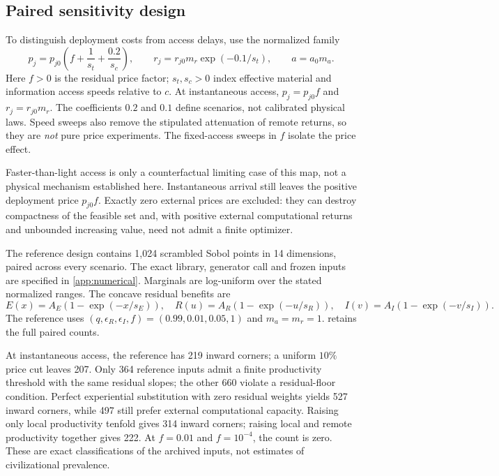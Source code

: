 \subsection{Paired sensitivity design}
To distinguish deployment costs from access delays, use the normalized
family
\begin{equation}
 p_j=p_{j0}\left(f+\frac{1}{s_t}+\frac{0.2}{s_c}\right),\qquad
 r_j=r_{j0}m_r\exp(-0.1/s_t),\qquad a=a_0m_a.
 \label{eq:speed-map}
\end{equation}
Here $f>0$ is the residual price factor; $s_t,s_c>0$ index effective
material and information access speeds relative to $c$.
At instantaneous access, $p_j=p_{j0}f$ and $r_j=r_{j0}m_r$.
The coefficients $0.2$ and $0.1$ define scenarios, not calibrated physical
laws. Speed sweeps also remove the stipulated attenuation of remote
returns, so they are \emph{not} pure price experiments. The fixed-access
sweeps in $f$ isolate the price effect.

Faster-than-light access is only a counterfactual limiting case of this
map, not a physical mechanism established here. Instantaneous arrival
still leaves the positive deployment price $p_{j0}f$. Exactly zero
external prices are excluded: they can destroy compactness of the
feasible set and, with positive external computational returns and
unbounded increasing value, need not admit a finite optimizer.

The reference design contains 1,024 scrambled Sobol points in 14
dimensions, paired across every scenario. The exact library, generator
call and frozen inputs are specified in \cref{app:numerical}. Marginals
are log-uniform over the stated normalized ranges. The concave residual
benefits are
\begin{equation}
 E(x)=A_E(1-\exp(-x/s_E)),\quad
 R(u)=A_R(1-\exp(-u/s_R)),\quad
 I(v)=A_I(1-\exp(-v/s_I)).
 \label{eq:benefit-family}
\end{equation}
The reference uses $(q,\epsilon_R,\epsilon_I,f)=(0.99,0.01,0.05,1)$
and $m_a=m_r=1$.  retains the full paired counts.

At instantaneous access, the reference has 219 inward corners; a
uniform $10\%$ price cut leaves 207. Only 364 reference inputs admit
a finite productivity threshold with the same residual slopes; the other
660 violate a residual-floor condition. Perfect experiential substitution
with zero residual weights yields 527 inward corners, while 497 still
prefer external computational capacity. Raising only local productivity
tenfold gives 314 inward corners; raising local and remote productivity
together gives 222. At $f=0.01$ and $f=10^{-4}$, the count is zero.
These are exact classifications of the archived inputs, not estimates of
civilizational prevalence.


